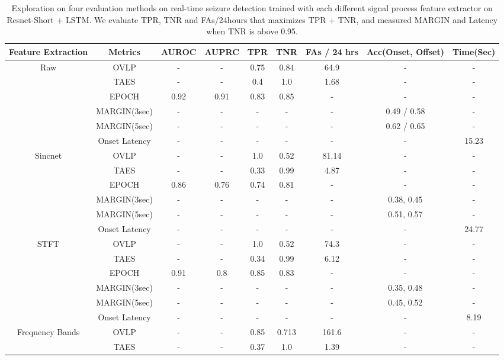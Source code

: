 \documentclass[pmlr,twocolumn,10pt]{jmlr}
\begin{document}
 \begin{table*}[ht!]
	\footnotesize
	\centering
	\caption {Exploration on four evaluation methods on real-time seizure detection trained with each different signal process feature extractor on Resnet-Short + LSTM. We evaluate TPR, TNR and FAs/24hours that maximizes TPR + TNR, and measured MARGIN and Latency when TNR is above 0.95.}
	\label{eval_preproc_appendix_resnetlstm}
	\begin{tabular}{c|c|ccccccc}
		\toprule
		Feature Extraction & Metrics & AUROC & AUPRC & TPR & TNR & FAs / 24 hrs & Acc(Onset, Offset) & Time(Sec)\\
		\midrule
		\multirow{6}{*}{Raw} 
		& OVLP & - & - & 0.75 & 0.84 & 64.9 & - & - \\
		& TAES & - & - & 0.4 & 1.0 & 1.68 & - & - \\
		& EPOCH & 0.92 & 0.91 & 0.83 & 0.85 & - & - & -  \\
		& MARGIN(3sec)  & - & - & - & - & - & 0.49 / 0.58 & -  \\
		& MARGIN(5sec) & - & - & - & - & - & 0.62 / 0.65 & -  \\
		& Onset Latency & - & - & - & - & - & - & 15.23 \\
		\midrule
		\multirow{6}{*}{Sincnet}
		& OVLP & - & - & 1.0 & 0.52 & 81.14 & - & - \\
		& TAES & - & - & 0.33 & 0.99 & 4.87 & - & - \\
		& EPOCH & 0.86 & 0.76 & 0.74 & 0.81 & - & - & - \\
		& MARGIN(3sec)  & - & - & - & - & - & 0.38, 0.45 & - \\
		& MARGIN(5sec) & - & - & - & - & - & 0.51, 0.57 & - \\
		& Onset Latency & - & - & - & - & - & - & 24.77 \\
		\midrule
		\multirow{6}{*}{STFT} 
		& OVLP & - & - & 1.0 & 0.52 & 74.3 & - & - \\
		& TAES & - & - & 0.34 & 0.99 & 6.12 & - & - \\
		& EPOCH & 0.91 & 0.8 & 0.85 & 0.83 & - & - & - \\
		& MARGIN(3sec)  & - & - & - & - & - & 0.35, 0.48 & - \\
		& MARGIN(5sec) & - & - & - & - & - & 0.45, 0.52 & - \\
		& Onset Latency & - & - & - & - & - & - & 8.19 \\
		\midrule
		\multirow{6}{*}{Frequency Bands} 
		& OVLP & - & - & 0.85 & 0.713 & 161.6 & - & - \\
		& TAES & - & - & 0.37 & 1.0 & 1.39 & - & - \\

\end{tabular}
\end{table*}
\end{document}
